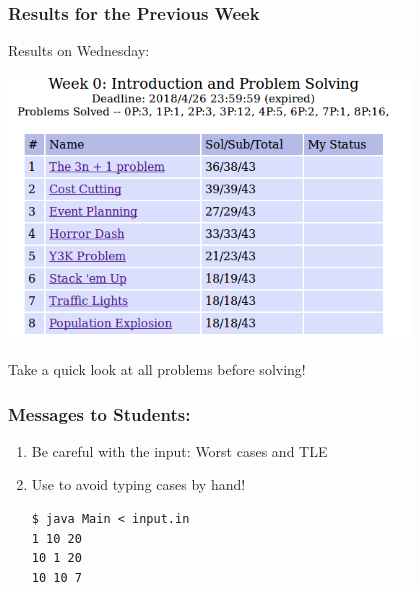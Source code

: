 \begin{frame}
  \frametitle{Results for the Previous Week}

  \begin{center}
    Results on Wednesday:
    \bigskip

    \includegraphics[width=0.8\textwidth]{img/resultW0}
  \end{center}

  \bigskip

   Take a quick look at all problems before solving!

\end{frame}

\begin{frame}[fragile]
  \frametitle{Messages to Students:}

  \begin{enumerate}
    \item Be careful with the input: \alert{Worst cases and TLE}
      \bigskip

    \item Use  to avoid typing cases by hand!

\begin{verbatim}
$ java Main < input.in
1 10 20
10 1 20
10 10 7
\end{verbatim}

  \end{enumerate}

\end{frame}

